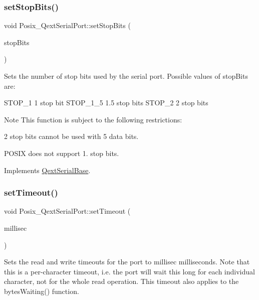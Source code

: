 \subsubsection{\texorpdfstring{set\+Stop\+Bits()}{setStopBits()}}
{\footnotesize\ttfamily void Posix\+\_\+\+Qext\+Serial\+Port\+::set\+Stop\+Bits (\begin{DoxyParamCaption}\item[{Stop\+Bits\+Type}]{stop\+Bits }\end{DoxyParamCaption})\hspace{0.3cm}{\ttfamily [virtual]}}

Sets the number of stop bits used by the serial port. Possible values of stop\+Bits are\+: \begin{DoxyVerb}    STOP_1      1 stop bit
    STOP_1_5    1.5 stop bits
    STOP_2      2 stop bits
\end{DoxyVerb}
 \begin{DoxyNote}{Note}
This function is subject to the following restrictions\+: 
\end{DoxyNote}
\begin{DoxyParagraph}{}
2 stop bits cannot be used with 5 data bits. 
\end{DoxyParagraph}
\begin{DoxyParagraph}{}
P\+O\+S\+IX does not support 1. stop bits. 
\end{DoxyParagraph}


Implements \mbox{\hyperlink{class_qext_serial_base}{Qext\+Serial\+Base}}.

\mbox{\label{class_posix___qext_serial_port_a33cde9629cc224628258dedbb5b48392}} 
\subsubsection{\texorpdfstring{set\+Timeout()}{setTimeout()}}
{\footnotesize\ttfamily void Posix\+\_\+\+Qext\+Serial\+Port\+::set\+Timeout (\begin{DoxyParamCaption}\item[{long}]{millisec }\end{DoxyParamCaption})\hspace{0.3cm}{\ttfamily [virtual]}}

Sets the read and write timeouts for the port to millisec milliseconds. Note that this is a per-\/character timeout, i.\+e. the port will wait this long for each individual character, not for the whole read operation. This timeout also applies to the bytes\+Waiting() function.

